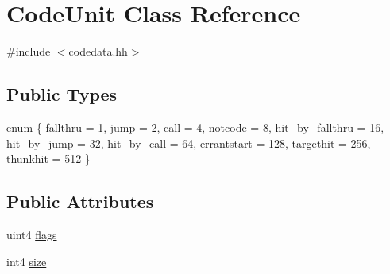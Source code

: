 \hypertarget{class_code_unit}{}\section{Code\+Unit Class Reference}
\label{class_code_unit}


{\ttfamily \#include $<$codedata.\+hh$>$}

\subsection*{Public Types}
\begin{DoxyCompactItemize}
\item 
enum \{ \newline
\mbox{\hyperlink{class_code_unit_a005eb898fbd2eb29c64d71602e623a97aeb5d5f48dd63094d448304dd26ca322e}{fallthru}} = 1, 
\mbox{\hyperlink{class_code_unit_a005eb898fbd2eb29c64d71602e623a97af0111b8529ce186c87513034f150cf55}{jump}} = 2, 
\mbox{\hyperlink{class_code_unit_a005eb898fbd2eb29c64d71602e623a97aab6f4c4d7774ba5dcb42168d1abd084b}{call}} = 4, 
\mbox{\hyperlink{class_code_unit_a005eb898fbd2eb29c64d71602e623a97a3118fdc53aef177e551b90f0e7a5a114}{notcode}} = 8, 
\newline
\mbox{\hyperlink{class_code_unit_a005eb898fbd2eb29c64d71602e623a97a8542a2c0005a0f06b2dc4d5e5c5cda09}{hit\+\_\+by\+\_\+fallthru}} = 16, 
\mbox{\hyperlink{class_code_unit_a005eb898fbd2eb29c64d71602e623a97a867e1323db81a3f16c974e1079d422a8}{hit\+\_\+by\+\_\+jump}} = 32, 
\mbox{\hyperlink{class_code_unit_a005eb898fbd2eb29c64d71602e623a97a179e95cb829f49a0a148b6f3971c6bc1}{hit\+\_\+by\+\_\+call}} = 64, 
\mbox{\hyperlink{class_code_unit_a005eb898fbd2eb29c64d71602e623a97a403943f43c761ba1c7948fdc717a8e74}{errantstart}} = 128, 
\newline
\mbox{\hyperlink{class_code_unit_a005eb898fbd2eb29c64d71602e623a97a74fe11367666de32674fc2cd1d96dd83}{targethit}} = 256, 
\mbox{\hyperlink{class_code_unit_a005eb898fbd2eb29c64d71602e623a97a0eeb6eb36f5a0b3b3c486a77dd50fa0b}{thunkhit}} = 512
 \}
\end{DoxyCompactItemize}
\subsection*{Public Attributes}
\begin{DoxyCompactItemize}
\item 
uint4 \mbox{\hyperlink{class_code_unit_a53d8c1ce994f42820230c2bac0a65a88}{flags}}
\item 
int4 \mbox{\hyperlink{class_code_unit_a704d5416d2e93beb88a791e2ae6337a6}{size}}
\end{DoxyCompactItemize}


